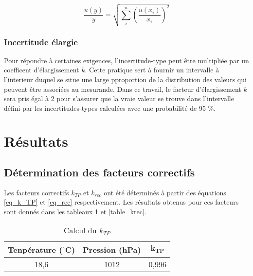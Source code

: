 \documentclass{article}
\begin{document}
\begin{equation}
  \dfrac{u(y)}{y} = \sqrt{\sum\limits_i^n \left( \dfrac{u(x_i)}{x_i} \right) ^2}
\end{equation}

\subsubsection{Incertitude élargie}

Pour répondre à certaines exigences, l'incertitude-type peut être multipliée par un coefficent d'élargissement $k$. Cette pratique sert à fournir un intervalle à l'interieur duquel se situe une large pproportion de la distribution des valeurs qui peuvent être associées au mesurande. Dans ce travail, le facteur d'élargissement $k$ sera pris égal à 2 pour s'assurer que la vraie valeur se trouve dans l'intervalle défini par les incertitudes-types calculées avec une probabilité de 95 \%.

\newpage
\section{Résultats}
\subsection{Détermination des facteurs correctifs}

Les facteurs correctifs $k_{TP}$ et $k_{rec}$ ont été déterminés à partir des équations \ref*{eq_k_TP} et \ref*{eq_rec} respectivement. Les résultats obtenus pour ces facteurs sont donnés dans les tableaux \ref*{table_kTP} et \ref*{table_krec}.

\begin{table}[h]
  \centering
  \begin{tabular}{ccc}
    \toprule
    \textbf{Tenpérature (}$\mathbf{^{\circ}}$\textbf{C)} & \textbf{Pression (hPa)} & $\mathbf{k_{TP}}$ \\
    \toprule
    18,6 & 1012 & 0,996 \\
    \bottomrule
  \end{tabular}
  \caption{Calcul du $k_{TP}$}
  \label{table_kTP}
\end{table}
\end{document}
